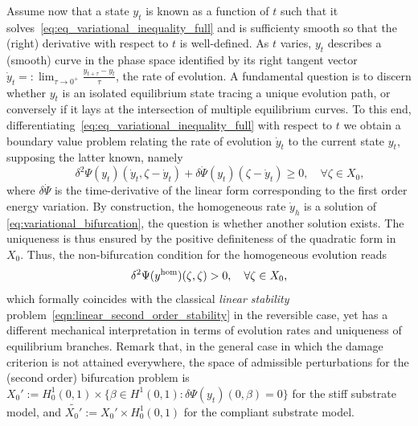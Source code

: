 \documentclass[10pt]{article}
\begin{document}
%


Assume now that a state $y_t$ is known as a function of $t$ such that it solves~\eqref{eq:eq_variational_inequality_full} and is sufficienty smooth so that the (right) derivative with respect to $t$ is well-defined.
As $t$ varies, $y_t$ describes a (smooth) curve in the phase space identified by its right tangent vector $\dot y_t =: \lim_{\tau\to 0^+}\frac{y_{t+\tau} - y_t}{\tau}$, the rate of evolution.
A fundamental question is to discern whether $y_t$ is an isolated equilibrium state tracing a unique evolution path, or conversely if it lays at the intersection of multiple equilibrium curves.
%
%
%
To this end, differentiating~\eqref{eq:eq_variational_inequality_full} with respect to $t$ we  obtain a boundary value problem relating the rate of evolution $\dot y_t$ to the current state $y_t$, supposing the latter known, namely
%
\begin{equation}
    \label{eq:variational_bifurcation}
    \qquad \delta^2 \Psi(y_t)(\dot y_t,   \zeta -\dot y_t) + \delta \dot \Psi(y_t)(\zeta-\dot y_t) \geq 0, \quad \forall \zeta\in X_{0},
\end{equation}
%
where $\delta \dot \Psi$ is the time-derivative of the linear form corresponding to the first order energy variation.
By construction, the homogeneous rate $\dot y_h$ is a solution of \eqref{eq:variational_bifurcation}, the question is whether another solution exists. The uniqueness is thus ensured by the positive definiteness of the quadratic form
%
in $X_0$.
Thus, the non-bifurcation condition for the homogeneous evolution reads
%
%
\begin{equation}
    \label{eq:bifurcation_uniqueness}
    \delta^2 \Psi(y^{\text{hom}})(\zeta, \zeta) > 0, \quad \forall \zeta \in X_0,
\end{equation}
which formally coincides with the classical \emph{linear stability} problem~\eqref{eqn:linear_second_order_stability} in the reversible case, yet has a different mechanical interpretation in terms of evolution rates and uniqueness of equilibrium branches.
Remark that, in the general case in which the damage criterion is not attained everywhere, the space of admissible perturbations for the (second order) bifurcation problem is $X_0':=H^1_0(0, 1) \times \{ \beta \in H^1(0, 1) : \delta\Psi(y_t)(0, \beta) = 0 \}$ for the stiff substrate model, and $\widetilde{X_0'}:=X_0'\times H^1_0(0,1)$ for the compliant substrate model.
\end{document}
